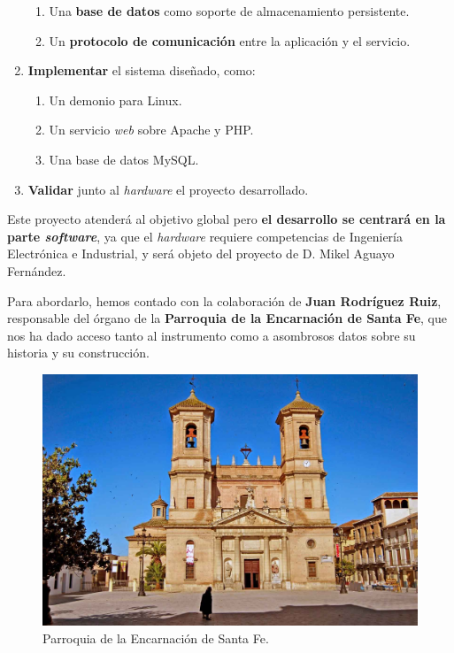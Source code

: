 \begin{enumerate}
\begin{enumerate}
		\item Una \textbf{base de datos} como soporte de almacenamiento persistente.
		\item Un \textbf{protocolo de comunicación} entre la aplicación y el servicio.
	\end{enumerate}
	
	\item \textbf{Implementar} el sistema diseñado, como:
	
	\begin{enumerate}
		\item Un demonio para Linux.
		\item Un servicio \textit{web} sobre Apache y \acrshort{PHP}.
		\item Una base de datos MySQL.
	\end{enumerate}
	
	\item \textbf{Validar} junto al \textit{hardware} el proyecto desarrollado.
\end{enumerate}

Este proyecto atenderá al objetivo global pero \textbf{el desarrollo se centrará en la parte \textit{software}}, ya que el \textit{hardware} requiere competencias de Ingeniería Electrónica e Industrial, y será objeto del proyecto de D. Mikel Aguayo Fernández.

Para abordarlo, hemos contado con la colaboración de \textbf{Juan Rodríguez Ruiz}, responsable del órgano de la \textbf{Parroquia de la Encarnación de Santa Fe}, que nos ha dado acceso tanto al instrumento como a asombrosos datos sobre su historia y su construcción.

\smallskip

\begin{figure}[H]
\noindent \begin{centering}
\includegraphics[width=\linewidth]{capitulo1/parroquia}
\par\end{centering}
\smallskip
\caption[Parroquia de la Encarnación de Santa Fe.]{\label{fig:parroquia} Parroquia de la Encarnación de Santa Fe. \cite{iglesias_granada}}
\end{figure}

